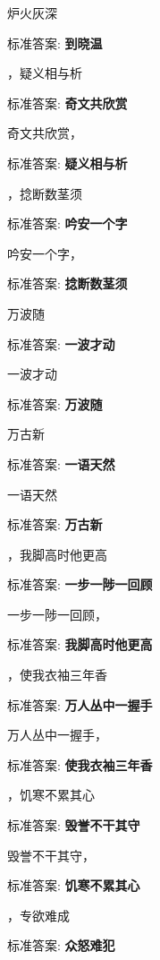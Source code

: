 \documentclass[12pt, a4paper, addpoints]{exam}
\begin{document}
\begin{multicols}{2}
\begin{questions}
\question[1] 炉火灰深\uline{\qquad\qquad\qquad}

标准答案: \textbf{到晓温}

\question[1] \uline{\qquad\qquad\qquad}，疑义相与析

标准答案: \textbf{奇文共欣赏}

\question[1] 奇文共欣赏，\uline{\qquad\qquad\qquad}

标准答案: \textbf{疑义相与析}

\question[1] \uline{\qquad\qquad\qquad}，捻断数茎须

标准答案: \textbf{吟安一个字}

\question[1] 吟安一个字，\uline{\qquad\qquad\qquad}

标准答案: \textbf{捻断数茎须}

\question[1] \uline{\qquad\qquad\qquad}万波随

标准答案: \textbf{一波才动}

\question[1] 一波才动\uline{\qquad\qquad\qquad}

标准答案: \textbf{万波随}

\question[1] \uline{\qquad\qquad\qquad}万古新

标准答案: \textbf{一语天然}

\question[1] 一语天然\uline{\qquad\qquad\qquad}

标准答案: \textbf{万古新}

\question[1] \uline{\qquad\qquad\qquad}，我脚高时他更高

标准答案: \textbf{一步一陟一回顾}

\question[1] 一步一陟一回顾，\uline{\qquad\qquad\qquad}

标准答案: \textbf{我脚高时他更高}

\question[1] \uline{\qquad\qquad\qquad}，使我衣袖三年香

标准答案: \textbf{万人丛中一握手}

\question[1] 万人丛中一握手，\uline{\qquad\qquad\qquad}

标准答案: \textbf{使我衣袖三年香}

\question[1] \uline{\qquad\qquad\qquad}，饥寒不累其心

标准答案: \textbf{毁誉不干其守}

\question[1] 毁誉不干其守，\uline{\qquad\qquad\qquad}

标准答案: \textbf{饥寒不累其心}

\question[1] \uline{\qquad\qquad\qquad}，专欲难成

标准答案: \textbf{众怒难犯}


\end{questions}
\end{multicols}
\end{document}
